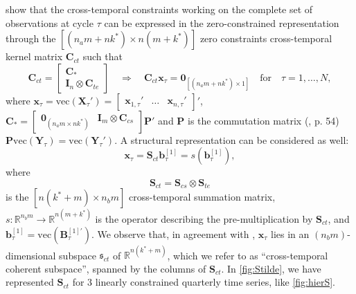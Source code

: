 \documentclass[a4paper,11pt]{article}
\newcommand{\bvet}{\bm{b}}
\newcommand{\xvet}{\bm{x}}
\newcommand{\Bvet}{\bm{B}}
\newcommand{\Cvet}{\bm{C}}
\newcommand{\Ivet}{\bm{I}}
\newcommand{\Pvet}{\bm{P}}
\newcommand{\Svet}{\bm{S}}
\newcommand{\Xvet}{\bm{X}}
\newcommand{\Yvet}{\bm{Y}}
\newcommand{\Zerovet}{\bm{0}}
\theoremstyle{definition}
\begin{document}
\cite{difonzo2023} show that the cross-temporal constraints working on the complete set of observations at cycle $\tau$ can be expressed in the zero-constrained representation through the $\left[(n_am+nk^\ast)\times n(m+k^\ast)\right]$ zero constraints cross-temporal kernel matrix $\Cvet_{ct}$ such that
\begin{equation}
	\label{eq:Cct}
	\Cvet_{ct} = \begin{bmatrix}
		\Cvet_\ast \\
		\Ivet_n \otimes \Cvet_{te}
	\end{bmatrix} \quad \Longrightarrow \quad
	\Cvet_{ct} \xvet_{\tau} = \Zerovet_{[(n_am+nk^\ast)\times1]} \quad \mathrm{for} \quad \tau = 1,\dots,N,
\end{equation}
where
$\xvet_{\tau} = \mathrm{vec}\left(\Xvet_{\tau}'\right) = \begin{bmatrix}
		\xvet_{1, \tau}' &
		\dots            &
		\xvet_{n, \tau}'
	\end{bmatrix}'$, %
$\Cvet_\ast = \begin{bmatrix}\Zerovet_{(n_a m\times nk^\ast)} & \Ivet_m \otimes \Cvet_{cs}\end{bmatrix}\Pvet'$ and $\Pvet$ is the commutation matrix (\citealp{magnus2019}, p. 54) $\Pvet \mathrm{vec}\left(\Yvet_{\tau}\right) = \mathrm{vec}\left(\Yvet_{\tau}'\right)$. A structural representation can be considered as well:
$$
	\xvet_\tau = \Svet_{ct}\bvet^{[1]}_\tau = s\left(\bvet_{\tau}^{[1]}\right),
$$
where
\begin{equation}
	\label{eq:Sct}
	\Svet_{ct} = \Svet_{cs} \otimes \Svet_{te}
\end{equation}
is the $\left[n(k^\ast+m)\times n_b m\right]$ cross-temporal summation matrix, $s: \mathbb{R}^{n_b m} \rightarrow \mathbb{R}^{n(m+k^\ast)}$ is the operator describing the pre-multiplication by $\Svet_{ct}$, and $\bvet^{[1]}_\tau = \mathrm{vec}\left(\Bvet^{[1]\prime}_{\tau}\right)$. We observe that, in agreement with \cite{panagiotelis2021}, $\xvet_{\tau}$ lies in an $(n_b m)$-dimensional subspace $\mathfrak{s}_{ct}$ of $\mathbb{R}^{n(k^\ast+m)}$, which we refer to as “cross-temporal coherent subspace”, spanned by the columns of $\Svet_{ct}$.
In \autoref{fig:Stilde}, we have represented $\Svet_{ct}$ for 3 linearly constrained quarterly time series, like \autoref{fig:hierS}.

\end{document}
